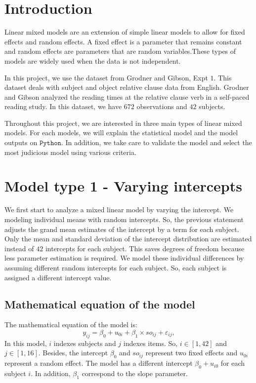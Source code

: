 \documentclass{article}
\begin{document}
\section*{Introduction}

Linear mixed models are an extension of simple linear models to allow for fixed effects and random effects. A fixed effect is a parameter that remains constant and random effects are parameters that are random variables.These types of models are widely used when the data is not independent.

In this project, we use the dataset from Grodner and Gibson, Expt $1$.
This dataset deals with subject and object relative clause data from English.
Grodner and Gibson analyzed the reading times at the relative clause verb in a self-paced reading study. In this dataset, we have $672$ observations and $42$ subjects.

Throughout this project, we are interested in three main types of linear mixed models. For each models, we will explain the statistical model and the model outputs on $\texttt{Python}$. In addition, we take care to validate the model and select the most judicious model using various criteria.


\section{Model type 1 - Varying intercepts}
We first start to analyze a mixed linear model by varying the intercept.
We modeling individual means with random intercepts.
So, the previous statement adjusts the grand mean estimates of the intercept by a term for each subject. Only the mean and standard deviation of the intercept distribution are estimated instead of $42$ intercepts for each subject.
This saves degrees of freedom because less parameter estimation is required.
We  model these individual differences by assuming different random intercepts for each subject. So, each subject is assigned a different intercept value.

\subsection{Mathematical equation of the model}
The mathematical equation of the model is:
\[y_{ij}= \beta_0 + u_{0i} + \beta_1 \times so_{ij} + \varepsilon_{ij},\]
In this model, $i$ indexes subjects and $j$ indexes items. So, $i \in [1,42]$ and $j \in [1,16].$
Besides, the intercept $\beta_0$ and $so_{ij}$  represent two fixed effects and $u_{0i}$ represent a random effect. The model has a different intercept $\beta_0 + u_{i0}$ for each subject $i$. In addition, $\beta_1$ correspond to the slope parameter.
\end{document}

